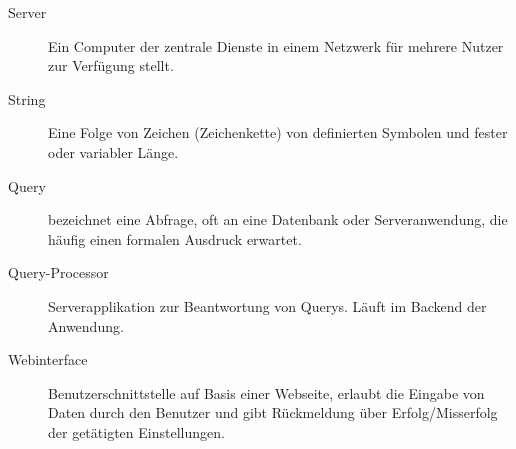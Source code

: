 \begin{description}
\item[Server] Ein Computer der zentrale Dienste in einem Netzwerk für mehrere
Nutzer zur Verfügung stellt. 

\item[String] Eine Folge von Zeichen (Zeichenkette) von definierten Symbolen und
fester oder variabler Länge.

\item[Query] bezeichnet eine Abfrage, oft an eine Datenbank oder
Serveranwendung, die häufig einen formalen Ausdruck erwartet.

\item[Query-Processor] Serverapplikation zur Beantwortung von Querys. Läuft im
Backend der Anwendung.

\item[Webinterface] Benutzerschnittstelle auf Basis einer Webseite, erlaubt die
Eingabe von Daten durch den Benutzer und gibt Rückmeldung über Erfolg/Misserfolg
der getätigten Einstellungen.

\end{description}
